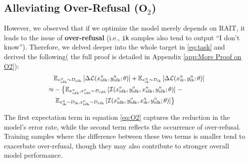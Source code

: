 \subsection{Alleviating Over-Refusal ($\mathbf{O}_2$)}
\label{sec:Alleviating Over-Refusal}
However, we observed that if we optimize the model merely depends on RAIT,
it leads to the issue of \textbf{over-refusal} (i.e., \texttt{ik} samples also tend to output ``I don't know''). Therefore, we delved deeper into the whole target in \eqref{eq:task} and derived the following( the full proof is detailed in Appendix \ref{app:More Proof on O2}):
\begin{equation}
\small
\label{eq:O2}
\begin{aligned}
&\mathbb{E}_{x^{u}_{\text{idk}} \sim D_{\text{idk}}} \left[ \Delta \mathcal{L}(x^{u}_{\text{idk}}, y^{u}_{\text{idk}}; \theta) \right ] 
+ \mathbb{E}_{x^{u}_{\text{ik}} \sim D_{\text{ik}}} \left[ \Delta \mathcal{L}(x^{u}_{\text{ik}}, y^{u}_{\text{ik}}; \theta) \right ] \\ 
\approx & - \left \{ \mathbb{E} _{x^{u} _{idk}, x^o _{idk} \sim D _{idk}} \left[ \mathcal{I}(x^{o} _{\text{idk}}, y^{o} _{\text{idk}}, x^{u} _{\text{idk}}, y^{u} _{\text{idk}}; \theta) \right] \right.  -\\
\quad &  \left . \mathbb{E} _{x^{u} _{\text{ik}} \sim D _\text{{ik}}, x^{o} _{\text{idk}} \sim D _{\text{idk}}} \left[ \mathcal{I}(x^{o} _{\text{idk}}, y^{o} _{\text{idk}}, x^{u} _{\text{ik}}, y^{u} _{\text{idk}}; \theta) \right] \right \}
\end{aligned} \noindent
\end{equation}


The first expectation term in equation \eqref{eq:O2} captures the reduction in the model's error rate, while the second term reflects the occurrence of over-refusal. Training samples where the difference between these two terms is smaller tend to exacerbate over-refusal, though they may also contribute to stronger overall model performance.

